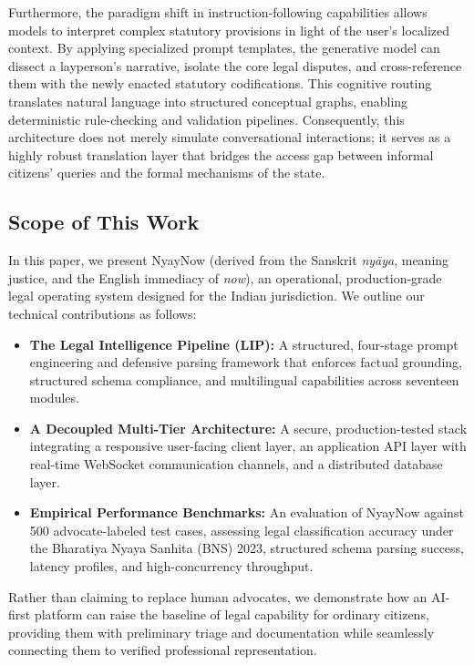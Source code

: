 \documentclass[conference]{IEEEtran}
\begin{document}
Furthermore, the paradigm shift in instruction-following capabilities allows models to interpret complex statutory provisions in light of the user's localized context. By applying specialized prompt templates, the generative model can dissect a layperson's narrative, isolate the core legal disputes, and cross-reference them with the newly enacted statutory codifications. This cognitive routing translates natural language into structured conceptual graphs, enabling deterministic rule-checking and validation pipelines. Consequently, this architecture does not merely simulate conversational interactions; it serves as a highly robust translation layer that bridges the access gap between informal citizens' queries and the formal mechanisms of the state.

\subsection{Scope of This Work}
In this paper, we present NyayNow (derived from the Sanskrit \textit{ny\={a}ya}, meaning justice, and the English immediacy of \textit{now}), an operational, production-grade legal operating system designed for the Indian jurisdiction. We outline our technical contributions as follows:
\begin{itemize}[leftmargin=*]
  \item \textbf{The Legal Intelligence Pipeline (LIP):} A structured, four-stage prompt engineering and defensive parsing framework that enforces factual grounding, structured schema compliance, and multilingual capabilities across seventeen modules.
  \item \textbf{A Decoupled Multi-Tier Architecture:} A secure, production-tested stack integrating a responsive user-facing client layer, an application API layer with real-time WebSocket communication channels, and a distributed database layer.
  \item \textbf{Empirical Performance Benchmarks:} An evaluation of NyayNow against 500 advocate-labeled test cases, assessing legal classification accuracy under the Bharatiya Nyaya Sanhita (BNS) 2023, structured schema parsing success, latency profiles, and high-concurrency throughput.
\end{itemize}

Rather than claiming to replace human advocates, we demonstrate how an AI-first platform can raise the baseline of legal capability for ordinary citizens, providing them with preliminary triage and documentation while seamlessly connecting them to verified professional representation.
\end{document}
